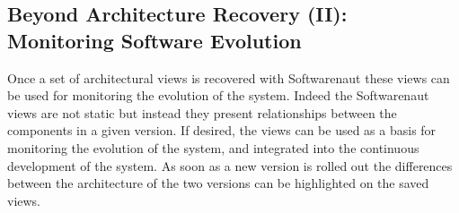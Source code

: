 \documentclass[preprint,12pt]{elsarticle}
\begin{document}
\subsection {Beyond Architecture Recovery (II): Monitoring Software Evolution}
Once a set of architectural views is recovered with Softwarenaut these views can be used for monitoring the evolution of the system. Indeed the Softwarenaut views are not static but instead they present relationships between the components in a given version. If desired, the views can be used as a basis for monitoring the evolution of the system, and integrated into the continuous development of the system. As soon as a new version is rolled out the differences between the architecture of the two versions can be highlighted on the saved views.



\newpage













\end{document}
